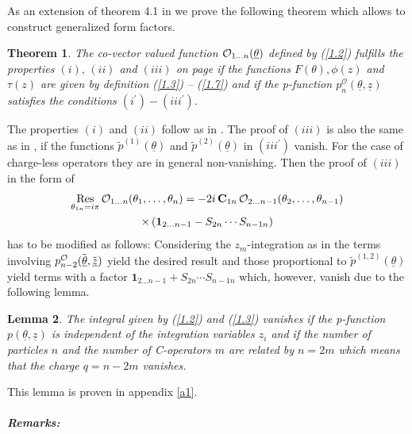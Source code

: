 \documentclass[a4paper,a4paper]{article}
\newtheorem{theorem}{Theorem}
\newtheorem{lemma}[theorem]{Lemma}
\def\proof{\noindent{\bfseries Proof. }}
\begin{document}
As an extension of theorem 4.1 in \cite{BFKZ} we prove the following theorem
which allows to construct generalized form factors.

\begin{theorem}
\label{t} The co-vector valued function $\mathcal{O}_{1\dots n}({\underline{%
\theta }})$ defined by (\ref{1.2}) fulfills the properties $(i),\,(ii)$ and $%
(iii)$ on page \pageref{pf} if the functions $F(\theta ),\phi (z)$ and $\tau
(z)$ are given by definition (\ref{1.3}) -- (\ref{1.7}) and if the
p-function $p_{n}^{\mathcal{O}}(\underline{\theta },\underline{z})$
satisfies the conditions $(i^{\prime })-(iii^{\prime })$.
\end{theorem}

\proof%
The properties $(i)$ and $(ii)$ follow as in \cite{BFKZ}. The proof of $%
(iii) $ is also the same as in \cite{BFKZ}, if the functions $\tilde{p}%
^{(1)}({\underline{\theta }})$ and $\tilde{p}^{(2)}({\underline{\theta }})$
in $(iii^{\prime })$ vanish. For the case of charge-less operators they are
in general non-vanishing. Then the proof of $(iii)$ in the form of 
\begin{multline*}
\mathop{\rm Res}_{\theta _{1n}=i\pi }\mathcal{O}_{1\dots n}(\theta
_{1},\dots ,\theta _{n})=-2i\,\mathbf{C}_{1n}\,\mathcal{O}_{2\dots
n-1}(\theta _{2},\dots ,\theta _{n-1}) \\
\times \left( \mathbf{1}_{2\dots n-1}-S_{2n}\cdots S_{n-1n}\right)
\end{multline*}
has to be modified as follows: Considering the $z_{m}$-integration as in 
\cite{BFKZ} the terms involving $p_{n-2}^{\mathcal{O}}(\tilde{\underline{%
\theta }},\tilde{\underline{z}})$ yield the desired result and those
proportional to $\tilde{p}^{(1,2)}({\underline{\theta }})$ yield terms with
a factor $\mathbf{1}_{2\dots n-1}+S_{2n}\cdots S_{n-1n}$ which, however,
vanish due to the following lemma.

\begin{lemma}
\label{l1} The integral given by (\ref{1.2}) and (\ref{1.3}) vanishes if the
p-function $p(\underline{\theta },\underline{z})$ is independent of the
integration variables $z_{i}$ and if the number of particles $n$ and the
number of C-operators $m$ are related by $n=2m$ which means that the charge $%
q=n-2m$ vanishes.
\end{lemma}

This lemma is proven in appendix \ref{a1}.

\subparagraph{Remarks:}
\end{document}
